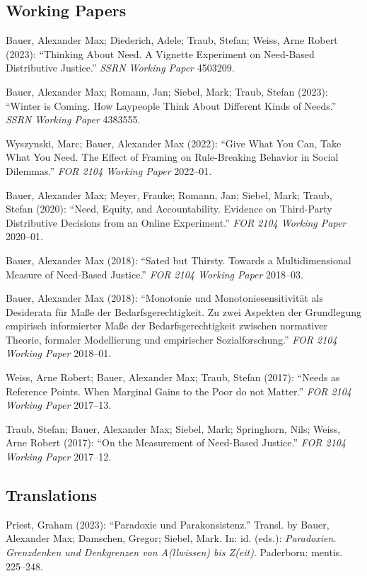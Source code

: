 \documentclass[a4paper,10pt]{article}
\newenvironment{literature}{%
   \parskip6pt\parindent0pt\raggedright
   \def\lititem{\hangindent=1cm\hangafter1}}{%
   \par\ignorespaces}
\begin{document}
\subsection*{Working Papers}
\begin{literature}
\lititem Bauer, Alexander Max; Diederich, Adele; Traub, Stefan; Weiss, Arne Robert (2023): \enquote{Thinking About Need. A Vignette Experiment on Need-Based Distributive Justice.} \textit{SSRN Working Paper} 4503209.

\lititem Bauer, Alexander Max; Romann, Jan; Siebel, Mark; Traub, Stefan (2023): \enquote{Winter is Coming. How Laypeople Think About Different Kinds of Needs.} \textit{SSRN Working Paper} 4383555.

\lititem Wyszynski, Marc; Bauer, Alexander Max (2022): \enquote{Give What You Can, Take What You Need. The Effect of Framing on Rule-Breaking Behavior in Social Dilemmas.} \textit{FOR 2104 Working Paper} 2022--01.

\lititem Bauer, Alexander Max; Meyer, Frauke; Romann, Jan; Siebel, Mark; Traub, Stefan (2020): \enquote{Need, Equity, and Accountability. Evidence on Third-Party Distributive Decisions from an Online Experiment.} \textit{FOR 2104 Working Paper} 2020--01.

\lititem Bauer, Alexander Max (2018): \enquote{Sated but Thirsty. Towards a Multidimensional Measure of Need-Based Justice.} \textit{FOR 2104 Working Paper} 2018--03.

\lititem Bauer, Alexander Max (2018): \enquote{Monotonie und Monotoniesensitivität als Desiderata für Maße der Bedarfsgerechtigkeit. Zu zwei Aspekten der Grundlegung empirisch informierter Maße der Bedarfsgerechtigkeit zwischen normativer Theorie, formaler Modellierung und empirischer Sozialforschung.} \textit{FOR 2104 Working Paper} 2018--01.

\lititem Weiss, Arne Robert; Bauer, Alexander Max; Traub, Stefan (2017): \enquote{Needs as Reference Points. When Marginal Gains to the Poor do not Matter.} \textit{FOR 2104 Working Paper} 2017--13.

\lititem Traub, Stefan; Bauer, Alexander Max; Siebel, Mark; Springhorn, Nils; Weiss, Arne Robert (2017): \enquote{On the Measurement of Need-Based Justice.} \textit{FOR 2104 Working Paper} 2017--12.
\end{literature}

\subsection*{Translations}
\begin{literature}
\lititem Priest, Graham (2023): \enquote{Paradoxie und Parakonsistenz.} Transl. by Bauer, Alexander Max; Damschen, Gregor; Siebel, Mark. In: id. (eds.): \textit{Paradoxien. Grenzdenken und Denkgrenzen von A(llwissen) bis Z(eit)}. Paderborn: mentis. 225--248.
\end{literature}
\end{document}
